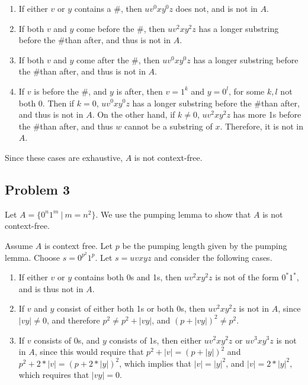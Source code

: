 \documentclass[12pt]
{article}
\def\mt{\mathtt}
\def\h{\ensuremath{\mt{\#}}}
\begin{document}
\begin{enumerate}
\item If either $v$ or $y$ contains a \h, then $uv^0xy^0z$ does not,
  and is not in $A$.

\item If both $v$ and $y$ come before the \h, then $uv^2xy^2z$ has a
  longer substring before the \h than after, and thus is not in $A$.

\item If both $v$ and $y$ come after the \h, then $uv^0xy^0z$ has a
  longer substring before the \h than after, and thus is not in $A$.

\item If $v$ is before the \h, and $y$ is after, then $v = 1^k$ and $y
  = 0^l$, for some $k,l$ not both 0.  Then if $k = 0$, $uv^0xy^0z$ has
  a longer substring before the \h than after, and thus is not in
  $A$.  On the other hand, if $k \neq 0$, $uv^2xy^2z$ has more 1s
  before the \h than after, and thus $w$ cannot be a substring of
  $x$.  Therefore, it is not in $A$.  
\end{enumerate}

Since these cases are exhaustive, $A$ is not context-free. 

\subsection*{Problem 3}

Let $A = \{0^n 1^m~|~ m = n^2 \}$.  We use the pumping
lemma to show that $A$ is not context-free.

Assume $A$ is context free.  Let $p$ be the pumping length given by
the pumping lemma.  Choose $s = 0^{p^2}1^p$.  Let $s = uvxyz$ and
consider the following cases.  

\begin{enumerate}
\item If either $v$ or $y$ contains both 0s and 1s, then $uv^2xy^2z$
  is not of the form $0^*1^*$, and is thus not in $A$.
\item If $v$ and $y$ consist of either both 1s or both 0s, then
  $uv^2xy^2z$ is not in $A$, since $|vy| \neq 0$, and therefore $p^2
  \neq p^2 + |vy|$, and $(p+|vy|)^2 \neq p^2$.

\item If $v$ consists of 0s, and $y$ consists of 1s, then either
  $uv^2xy^2z$ or $uv^3xy^3z$ is not in $A$, since this would require
  that $p^2+|v| = (p+|y|)^2$ and $p^2+2*|v| = (p+2*|y|)^2$, which
  implies that $|v| = |y|^2$, and $|v| = 2*|y|^2$, which requires that
  $|vy| = 0$.

\end{enumerate}
\end{document}
